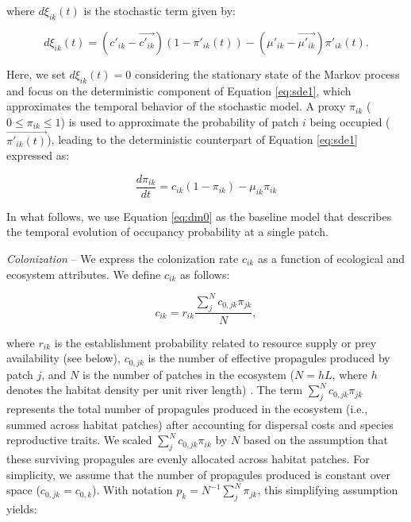 \documentclass[11pt, class=article, crop=false]{standalone}
\begin{document}
where $d\xi_{ik}(t)$ is the stochastic term given by:

\begin{equation}
    d\xi_{ik}(t) = (c'_{ik} - \overrightarrow{c'_{ik}}) (1 - \pi'_{ik}(t)) - (\mu'_{ik} - \overrightarrow{\mu'_{ik}}) \pi'_{ik}(t).
\end{equation}

Here, we set $d\xi_{ik}(t) = 0$ considering the stationary state of the Markov process and focus on the deterministic component of Equation \ref{eq:sde1}, which approximates the temporal behavior of the stochastic model.
A proxy $\pi_{ik}$ ($0 \le \pi_{ik} \le 1$) is used to approximate the probability of patch $i$ being occupied ($\overrightarrow{\pi'_{ik}(t)}$), leading to the deterministic counterpart of Equation \ref{eq:sde1} expressed as:

\begin{equation}
    \frac{d \pi_{ik}}{d t} = c_{ik} (1 - \pi_{ik}) - \mu_{ik} \pi_{ik}
    \label{eq:dm0}
\end{equation}

In what follows, we use Equation \ref{eq:dm0} as the baseline model that describes the temporal evolution of occupancy probability at a single patch.

\textit{Colonization} --
We express the colonization rate $c_{ik}$ as a function of ecological and ecosystem attributes.
We define $c_{ik}$ as follows:

\begin{equation}
    c_{ik} = r_{ik} \frac{\sum_{j}^N c_{0, jk} \pi_{jk}}{N},
    \label{eq:clnz}
\end{equation}

where $r_{ik}$ is the establishment probability related to resource supply or prey availability (see below), $c_{0, jk}$ is the number of effective propagules produced by patch $j$, and $N$ is the number of patches in the ecosystem ($N = hL$, where $h$ denotes the habitat density per unit river length) .
The term $\sum_{j}^N c_{0, jk} \pi_{jk}$ represents the total number of propagules produced in the ecosystem (i.e., summed across habitat patches) after accounting for dispersal costs and species reproductive traits.
We scaled $\sum_{j}^N c_{0, jk} \pi_{ik}$ by $N$ based on the assumption that these surviving propagules are evenly allocated across habitat patches.
For simplicity, we assume that the number of propagules produced is constant over space ($c_{0, jk} = c_{0, k}$).
With notation $p_k = N^{-1}\sum_{j}^N \pi_{jk}$, this simplifying assumption yields:
\end{document}
